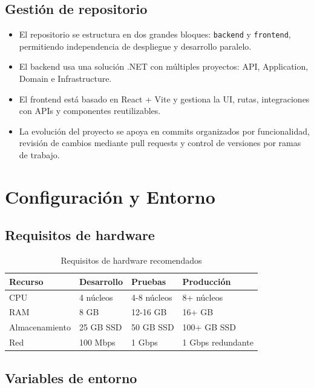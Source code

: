 \documentclass[12pt,letterpaper]{article}
\begin{document}
	\subsection{Gestión de repositorio}
	
	\begin{itemize}
		\item El repositorio se estructura en dos grandes bloques: \texttt{backend} y \texttt{frontend}, permitiendo independencia de despliegue y desarrollo paralelo.
		\item El backend usa una solución .NET con múltiples proyectos: API, Application, Domain e Infrastructure.
		\item El frontend está basado en React + Vite y gestiona la UI, rutas, integraciones con APIs y componentes reutilizables.
		\item La evolución del proyecto se apoya en commits organizados por funcionalidad, revisión de cambios mediante pull requests y control de versiones por ramas de trabajo.
	\end{itemize}
	
	\section{Configuración y Entorno}
	
	\subsection{Requisitos de hardware}
	
	\begin{table}[H]
		\centering
		\caption{Requisitos de hardware recomendados}
		\label{tab:hardware}
		\begin{tabular}{|l|l|l|l|}
			\hline
			\textbf{Recurso} & \textbf{Desarrollo} & \textbf{Pruebas} & \textbf{Producción} \\ \hline
			CPU & 4 núcleos & 4-8 núcleos & 8+ núcleos \\ \hline
			RAM & 8 GB & 12-16 GB & 16+ GB \\ \hline
			Almacenamiento & 25 GB SSD & 50 GB SSD & 100+ GB SSD \\ \hline
			Red & 100 Mbps & 1 Gbps & 1 Gbps redundante \\ \hline
		\end{tabular}
	\end{table}
	
	\subsection{Variables de entorno}
	
\end{document}
